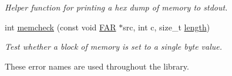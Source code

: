 \begin{DoxyCompactItemize}
\begin{DoxyCompactList}\small\item\em Helper function for printing a hex dump of memory to stdout. \end{DoxyCompactList}\item 
int \hyperlink{group__hal_gaae7cb3384b4bbd83726511ccfbd747d3}{memcheck} (const void \hyperlink{group__hal_gaef060b3456fdcc093a7210a762d5f2ed}{F\+AR} $\ast$src, int c, size\+\_\+t \hyperlink{group__zdo_gab2b3adeb2a67e656ff030b56727fd0ac}{length})
\begin{DoxyCompactList}\small\item\em Test whether a block of memory is set to a single byte value. \end{DoxyCompactList}\end{DoxyCompactItemize}
\label{_amgrp01747264fe7bf50731df0522c351974e}%
These error names are used throughout the library.

